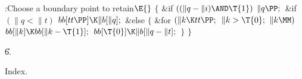 \B{}:Choose a boundary point to retain\X${}\E{}$%
\6
${}\{{}$\1\6
\&{if} ${}((\|q-\|i)\AND\T{1}){}$\1\5
${}\|q\PP;{}$\2\6
\&{if} ${}(\|q<\|t){}$\1\5
${}\\{bb}[\\{tt}\PP]\K\|b[\|q];{}$\2\6
\&{else}\5
${}\{{}$\1\6
\&{for} ${}(\|k\K\\{tt}\PP;{}$ ${}\|k>\T{0};{}$ ${}\|k\MM){}$\1\5
${}\\{bb}[\|k]\K\\{bb}[\|k-\T{1}];{}$\2\6
${}\\{bb}[\T{0}]\K\|b[\|q-\|t];{}$\6
\4${}\}{}$\2\6
\4${}\}{}$\2\par
\U6.\fi

Index.
\fi

\inx
\fin
\con
